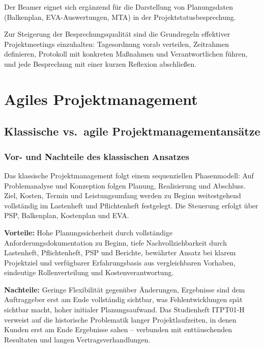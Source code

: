 \documentclass[
    a4paper,
    11pt,
    bibliography=totoc,
    listof=totoc,
    parskip=half,
    headings=normal
]{scrbook}
\begin{document}
Der Beamer eignet sich ergänzend für die Darstellung von Planungsdaten
(Balkenplan, EVA-Auswertungen, MTA) in der Projektstatusbesprechung.

Zur Steigerung der Besprechungsqualität sind die Grundregeln effektiver
Projektmeetings einzuhalten: Tagesordnung vorab verteilen, Zeitrahmen
definieren, Protokoll mit konkreten Maßnahmen und Verantwortlichen führen,
und jede Besprechung mit einer kurzen Reflexion abschließen\autocite[vgl.][Kap.~2]{Kiefer2010}.

\chapter{Agiles Projektmanagement}

\section{Klassische vs.\ agile Projektmanagementansätze}

\subsection{Vor- und Nachteile des klassischen Ansatzes}

Das klassische Projektmanagement folgt einem sequenziellen Phasenmodell\autocite[vgl.][Kap.~2]{Mayer2014}: Auf Problemanalyse und Konzeption folgen
Planung, Realisierung und Abschluss. Ziel, Kosten, Termin und Leistungsumfang
werden zu Beginn weitestgehend vollständig im Lastenheft und Pflichtenheft
festgelegt. Die Steuerung erfolgt über PSP, Balkenplan, Kostenplan und EVA.

\textbf{Vorteile:} Hohe Planungssicherheit durch vollständige Anforderungsdokumentation
zu Beginn, tiefe Nachvollziehbarkeit durch Lastenheft, Pflichtenheft, PSP und
Berichte, bewährter Ansatz bei klarem Projektziel und verfügbarer Erfahrungsbasis
aus vergleichbaren Vorhaben, eindeutige Rollenverteilung und
Kostenverantwortung\autocite[vgl.][Kap.~2]{Mayer2014}.

\textbf{Nachteile:} Geringe Flexibilität gegenüber Änderungen, Ergebnisse sind dem
Auftraggeber erst am Ende vollständig sichtbar, was Fehlentwicklungen spät sichtbar
macht, hoher initialer Planungsaufwand. Das Studienheft ITPT01-H verweist auf die
historische Problematik langer Projektlaufzeiten, in denen Kunden erst am Ende
Ergebnisse sahen -- verbunden mit enttäuschenden Resultaten und langen Vertragsverhandlungen\autocite[vgl.][Kap.~1]{Reppin2020}.
\end{document}
